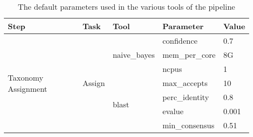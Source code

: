 \begin{table}[h]
\centering
\small
\begin{tabular}{lllll}
\hline
\textbf{Step}                             & \textbf{Task}                                            & \textbf{Tool}                          & \textbf{Parameter}                     & \textbf{Value}                                                                                           \\ \hline
\multirow{7}{*}{Taxonomy Assignment}      & \multirow{7}{*}{Assign}                                  & \multirow{3}{*}{naive\_bayes}          & confidence                             & 0.7                                                                                                      \\
                                          &                                                          &                                        & mem\_per\_core                         & 8G                                                                                                       \\
                                          &                                                          &                                        & ncpus                                  & 1                                                                                                        \\
                                          &                                                          & \multirow{4}{*}{blast}                 & max\_accepts                           & 10                                                                                                       \\
                                          &                                                          &                                        & perc\_identity                         & 0.8                                                                                                      \\
                                          &                                                          &                                        & evalue                                 & 0.001                                                                                                    \\
                                          &                                                          &                                        & min\_consensus                         & 0.51                                                                                                     \\ \hline
\end{tabular}
\caption{The default parameters used in the various tools of the pipeline}
\label{tab:all_parameters}
\end{table}


